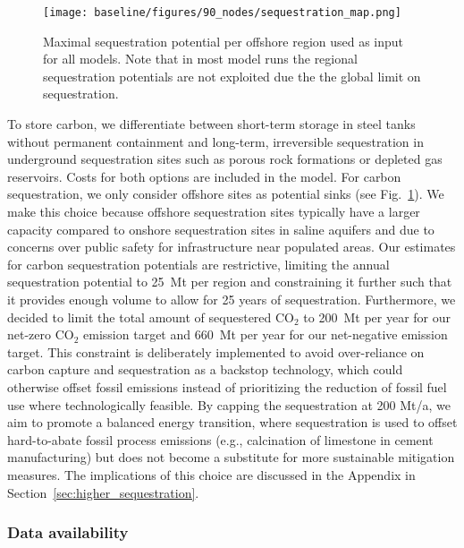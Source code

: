 \documentclass[twocolumn]{article}
\newcommand{\carbon}{CO$_2$}
\begin{document}

\begin{figure}[h!]
    \centering
    \texttt{[image: baseline/figures/90\_nodes/sequestration\_map.png]}
    \caption{Maximal sequestration potential per offshore region used as input for all models. Note that in most model runs the regional sequestration potentials are not exploited due the the global limit on sequestration.}
    \label{fig:sequestration_map}
\end{figure}

To store carbon, we differentiate between short-term storage in steel tanks without permanent containment and long-term, irreversible sequestration in underground sequestration sites such as porous rock formations or depleted gas reservoirs.
Costs for both options are included in the model.
For carbon sequestration, we only consider offshore sites as potential sinks (see Fig.~\ref{fig:sequestration_map}).
We make this choice because offshore sequestration sites typically have a larger capacity compared to onshore sequestration sites in saline aquifers and due to concerns over public safety for infrastructure near populated areas.
Our estimates for carbon sequestration potentials are restrictive, limiting the annual sequestration potential to 25~Mt per region and constraining it further such that it provides enough volume to allow for 25 years of sequestration.
Furthermore, we decided to limit the total amount of sequestered \carbon{} to 200~Mt per year for our net-zero \carbon{} emission target and 660~Mt per year for our net-negative emission target.
This constraint is deliberately implemented to avoid over-reliance on carbon capture and sequestration as a backstop technology, which could otherwise offset fossil emissions instead of prioritizing the reduction of fossil fuel use where technologically feasible. By capping the sequestration at 200 Mt/a, we aim to promote a balanced energy transition, where sequestration is used to offset hard-to-abate fossil process emissions (e.g., calcination of limestone in cement manufacturing) but does not become a substitute for more sustainable mitigation measures. The implications of this choice are discussed in the Appendix in Section~\ref{sec:higher_sequestration}.


\subsubsection*{Data availability}
\end{document}
